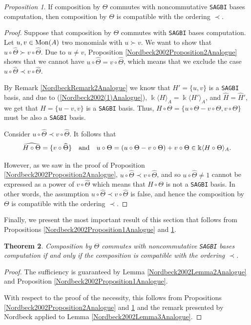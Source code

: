\documentclass{amsart}
\newtheorem{theorem}{Theorem}[section]
\theoremstyle{definition}
\theoremstyle{remark}
\newtheorem{proposition}[theorem]{Proposition}
\numberwithin{equation}{section}
\begin{document}
\begin{proposition}\label{Nordbeck2002Proposition3Analogue}
If composition by $\Theta$ commutes with noncommutative {\rm \texttt{SAGBI}} bases computation, then composition by $\Theta$ is compatible with the ordering $\prec$.   
\end{proposition}
\begin{proof}
Suppose that composition by $\Theta$ commutes with \texttt{SAGBI} bases computation. Let $u, v \in {\rm Mon}(A)$ two monomials with $u\succ v$. We want to show that $u \circ \widehat{\Theta} \succ v\circ \widehat{\Theta}$. Due to $u \neq v$, Proposition \ref{Nordbeck2002Proposition2Analogue} shows that we cannot have $u \circ \widehat{\Theta} = v \circ \widehat{\Theta}$, which means that we exclude the case $u \circ \widehat{\Theta} \prec v\circ \widehat{\Theta}$.

By Remark \ref{NordbeckRemark2Analogue} we know that $H' = \{u, v\}$ is a \texttt{SAGBI} basis, and due to (\ref{Nordbeck2002(1)Analogue}), $\Bbbk \langle H\rangle_A = \Bbbk \langle H' \rangle_A$, and $\widehat{H} = \widehat{H}'$, we get that $H = \{u - v, v\}$ is a \texttt{SAGBI} basis. Thus, $H \circ \Theta = \{u \circ \Theta - v \circ \Theta, v\circ \Theta\}$ must be also a \texttt{SAGBI} basis.

Consider $u\circ \widehat{\Theta} \prec v \circ \widehat{\Theta}$. It follows that 
$$\widehat{H \circ \Theta} = \{v \circ \widehat{\Theta}\} \quad {\rm and} \quad u\circ \Theta = (u\circ \Theta - v\circ \Theta) + v\circ \Theta \in \Bbbk \langle H \circ \Theta \rangle_A.
$$ 

However, as we saw in the proof of Proposition \ref{Nordbeck2002Proposition2Analogue}, $u \circ \widehat{\Theta} \prec v \circ \widehat{\Theta}$, and so $u \circ \widehat{\Theta} \neq 1$ cannot be expressed as a power of $v \circ \widehat{\Theta}$ which means that $H \circ \Theta$ is not a \texttt{SAGBI} basis. In other words, the assumption $u \circ \widehat{\Theta} \prec v \circ \widehat{\Theta}$ is false, and hence the composition by $\Theta$ is compatible with the ordering $\prec$.
\end{proof}

Finally, we present the most important result of this section that follows from Propositions \ref{Nordbeck2002Proposition1Analogue} and \ref{Nordbeck2002Proposition3Analogue}.

\begin{theorem}\label{Nordbeck2002Theorem4Analogue}
    Composition by $\Theta$ commutes with noncommutative {\rm \texttt{SAGBI}} bases computation if and only if the composition is compatible with the ordering $\prec$.
\end{theorem}
\begin{proof}
	The sufficiency is guaranteed by Lemma \ref{Nordbeck2002Lemma2Analogue}
 and Proposition \ref{Nordbeck2002Proposition1Analogue}. 
 
 With respect to the proof of the necessity, this follows from Propositions  \ref{Nordbeck2002Proposition2Analogue} and \ref{Nordbeck2002Proposition3Analogue} and the remark presented by Nordbeck \cite[Theorem 4]{Nordbeck2002} applied to Lemma \ref{Nordbeck2002Lemma3Analogue}.
\end{proof}
\end{document}

